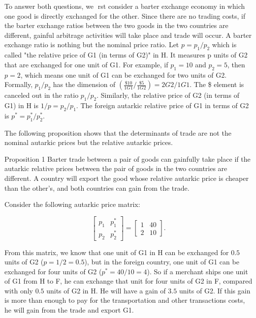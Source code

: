 To answer both questions, we rst consider a barter exchange economy in which one good is directly exchanged for the other. Since there are no trading costs, if the barter exchange ratios between the two goods in the two countries are different, gainful arbitrage activities will take place and trade will occur. A barter exchange ratio is nothing but the nominal price ratio. Let $p =p_1 / p_2$ which is called "the relative price of G1 (in terms of G2)" in H. It measures p units of G2 that are exchanged for one unit of G1. For example, if $p_1 = 10$ and $p_2 = 5$, then $p = 2$, which means one unit of G1 can be exchanged for two units of G2. Formally, $p_1 / p_2$ has the dimension of
$ \left( \frac{\$10}{1G1} / \frac{\$5}{1G2} \right)  =  2G2/1G1 $. The \$ element is canceled out in the ratio $p_1 / p_2$. Similarly, the relative price of G2 (in terms of G1) in H is $1/p = p_2 / p_1$. The foreign autarkic relative price of G1 in terms of G2 is $p^* = p_1^* / p_2^*$.

The following proposition shows that the determinants of trade are not the nominal autarkic prices but the relative autarkic prices.

Proposition 1 Barter trade between a pair of goods can gainfully take place if the autarkic relative prices between the pair of goods in the two countries are different. A country will export the good whose relative autarkic price is cheaper than the other's, and both countries can gain from the trade.

Consider the following autarkic price matrix:

\begin{equation}
\left[\begin{array}{ll}
p_1 & p_1^* \\
p_2 & p_2^*
\end{array}\right]=\left[\begin{array}{ll}
1 & 40 \\
2 & 10
\end{array}\right].
\end{equation}

From this matrix, we know that one unit of G1 in H can be exchanged for $0.5$ units of G2 ($p = 1/2 = 0.5$), but in the foreign country, one unit of G1 can be exchanged for four units of G2 ($p^* = 40/10 = 4$). So if a merchant ships one unit of G1 from H to F, he can exchange that unit for four units of G2 in F, compared with only $0.5$ units of G2 in H. He will have a gain of $3.5$ units of G2. If this gain is more than enough to pay for the transportation and other transactions costs, he will gain from the trade and export G1.

